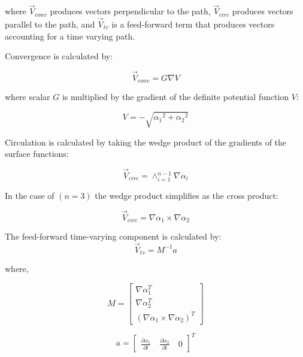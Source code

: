 \documentclass[conf]{new-aiaa}
\begin{document}
where $\overrightarrow{V}_{conv}$ produces vectors perpendicular to the path, $\overrightarrow{V}_{circ}$ produces vectors parallel to the path, and $\overrightarrow{V}_{tv}$ is a feed-forward term that produces vectors accounting for a time varying path. 

Convergence is calculated by:

\begin{equation}
\vec{V}_{conv} = G \nabla V  
\label{convOnly}
\end{equation}

where scalar $G$ is multiplied by the gradient of the definite potential function $V$:

\begin{equation}
V = -\sqrt{{\alpha_1}^2 + {\alpha_2}^2}
\end{equation}



Circulation is calculated by taking the wedge product of the gradients of the surface functions:

\begin{equation}
\vec{V}_{circ} =  \wedge_{i=1}^{n-1}\nabla\alpha_i 
\label{circOnly}
\end{equation}

In the case of $(n=3)$ the wedge product simplifies as the cross product:

\begin{equation}
\vec{V}_{circ} =  \nabla\alpha_1 \times \nabla\alpha_2 
\label{circOnlySimp}
\end{equation}

The feed-forward time-varying component is calculated by:
\begin{equation}
\label{tv}
\vec{V}_{tv} = M^{-1}a
\end{equation}

where,

\begin{equation}
\label{mMatrix}
M =\begin{bmatrix}
\nabla\alpha_1^T \\
\nabla\alpha_2^T \\
(\nabla\alpha_1 \times \nabla\alpha_2)^T
\end{bmatrix}
\end{equation}

\begin{equation}
\label{aVector}
a =\begin{bmatrix}
\frac{\partial \alpha_1}{\partial t} \quad   \frac{\partial \alpha_2}{\partial t} \quad   0
\end{bmatrix}^T
\end{equation}
\end{document}
